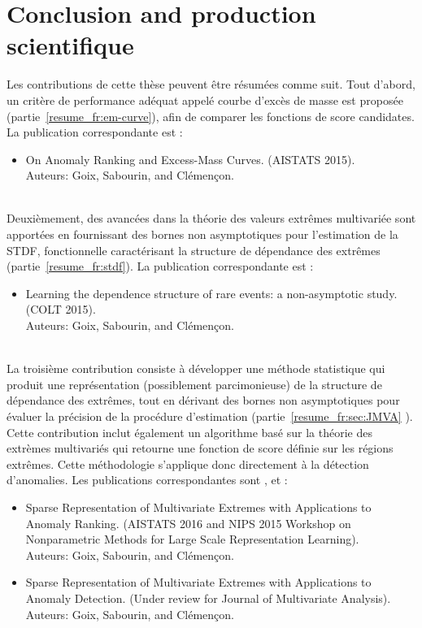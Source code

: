 \section{Conclusion and production scientifique}
\label{resume_fr:intro:concl}
Les contributions de cette thèse peuvent être résumées comme suit.
%
Tout d'abord, un critère de performance adéquat appelé courbe d'excès de masse est proposée (partie~\ref{resume_fr:em-curve}), afin de comparer les fonctions de score candidates.
La publication correspondante est \cite{AISTAT15}:
%
\begin{itemize}
\item On Anomaly Ranking and Excess-Mass Curves. (AISTATS 2015).\\
Auteurs: Goix, Sabourin, and Clémençon. 
\end{itemize}

~\\
Deuxièmement, des avancées dans la théorie des valeurs extrêmes multivariée sont apportées en fournissant des bornes non asymptotiques pour l'estimation de la STDF, fonctionnelle caractérisant la structure de dépendance des extrêmes (partie~\ref{resume_fr:stdf}). La publication correspondante est \cite{COLT15}:
%
\begin{itemize}
\item Learning the dependence structure of rare events: a non-asymptotic study. (COLT 2015).\\
Auteurs: Goix, Sabourin, and Clémençon.
\end{itemize}

~\\
La troisième contribution consiste à développer une méthode statistique qui produit une représentation (possiblement parcimonieuse) de la structure de dépendance des extrêmes, tout en dérivant des bornes non asymptotiques pour évaluer la précision de la procédure d'estimation (partie~\ref{resume_fr:sec:JMVA} ).
Cette contribution inclut également un algorithme basé sur la théorie des extrèmes multivariés qui retourne une fonction de score définie sur les régions extrêmes. Cette méthodologie s'applique donc directement à la détection d'anomalies.
%
Les publications correspondantes sont \cite{AISTAT16}, \cite{NIPSWORKSHOP15} et \cite{ARXIV16}:
%
\begin{itemize}
\item Sparse Representation of Multivariate Extremes with Applications to Anomaly Ranking. (AISTATS 2016 and NIPS 2015 Workshop on Nonparametric Methods for Large Scale Representation Learning).\\
Auteurs: Goix, Sabourin, and Clémençon.
\item Sparse Representation of Multivariate Extremes with Applications to Anomaly Detection. (Under review for Journal of Multivariate Analysis).\\
Auteurs: Goix, Sabourin, and Clémençon.
\end{itemize}



